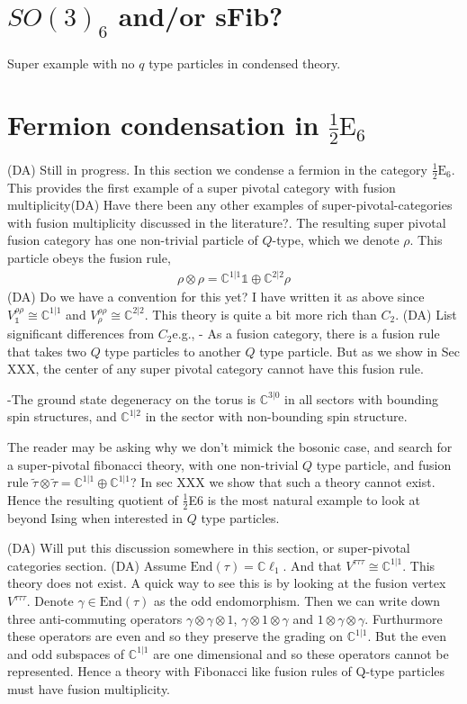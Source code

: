\documentclass[12pt,a4paper]{article}
\newcommand{\tp}{\otimes}
\newcommand{\dave}[1]{{\color{ao(english)}\footnotesize{(DA) #1}}}
\newcommand{\halfesix}{\frac{1}{2}\text{E}_6}
\begin{document}
\section{$SO(3)_6$ and/or sFib?}
Super example with no $q$ type particles in condensed theory.


\section{Fermion condensation in $\halfesix$} \label{e6}
\dave{Still in progress.}
In this section we condense a fermion in the category $\halfesix$.
This provides the first example of a super pivotal category with fusion multiplicity\dave{Have there been any other examples of super-pivotal-categories with fusion multiplicity discussed in the literature?}.
The resulting super pivotal fusion category has one non-trivial particle of $Q$-type, which we denote $\rho$.
This particle obeys the fusion rule,
\begin{align}
\rho \tp \rho = \mathbb{C}^{1|1} \mathds{1} \oplus \mathbb{C}^{2|2} \rho
\end{align}
\dave{Do we have a convention for this yet? I have written it as above since $V^{\rho \rho}_\mathds{1}  \cong  \mathbb{C}^{1|1}$ and $ V^{\rho \rho}_\rho \cong \mathbb{C}^{2|2}$.}
This theory is quite a bit more rich than $C_2$. 
\dave{List significant differences from $C_2$}e.g.,
- As a fusion category, there is a fusion rule that takes two $Q$ type particles to another $Q$ type particle. 
But as we show in Sec XXX, the center of any super pivotal category cannot have this fusion rule.

-The ground state degeneracy on the torus is $\mathbb{C}^{3|0}$ in all sectors with bounding spin structures, and $\mathbb{C}^{1|2}$ in the sector with non-bounding spin structure.

The reader may be asking why we don't mimick the bosonic case, and search for a super-pivotal fibonacci theory, with one non-trivial $Q$ type particle, and fusion rule $\tilde{\tau} \tp \tilde{\tau} = \mathbb{C}^{1|1} \oplus \mathbb{C}^{1|1}$?
In sec XXX we show that such a theory cannot exist.
Hence the resulting quotient of $\frac{1}{2}$E6 is the most natural example to look at beyond Ising when interested in $Q$ type particles. 

\dave{Will put this discussion somewhere in this section, or super-pivotal categories section.}
\dave{Assume $\text{End}(\tau) = \mathbb{C} \ell_1$. And that $V^{\tau \tau \tau} \cong \mathbb{C}^{1|1}$.
This theory does not exist. 
A quick way to see this is by looking at the fusion vertex $V^{\tau \tau \tau}$. 
Denote $\gamma \in \text{End}(\tau)$ as the odd endomorphism.
Then we can write down three anti-commuting operators $\gamma \tp \gamma \tp 1$, $\gamma \tp 1 \tp \gamma$ and $1\tp \gamma \tp \gamma$. 
Furthurmore these operators are even and so they preserve the grading on $\mathbb{C}^{1|1}$. 
But the even and odd subspaces of $\mathbb{C}^{1|1}$ are one dimensional and so these operators cannot be represented.
Hence a theory with Fibonacci like fusion rules of Q-type particles must have fusion multiplicity.
}
\end{document}
